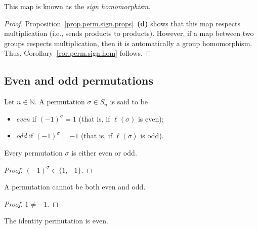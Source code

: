 This map is known as the \emph{sign homomorphism}.

\begin{proof}
Proposition~\ref{prop.perm.sign.props}~\textbf{(d)} shows that this map
respects multiplication (i.e., sends products to products). However, if a
map between two groups respects multiplication, then it is automatically a
group homomorphism. Thus, Corollary~\ref{cor.perm.sign.hom} follows.
\end{proof}

\subsection{Even and odd permutations}

\begin{definition}
\label{def.perm.even-odd}
\leantarget
\leanok
Let $n \in \mathbb{N}$. A permutation $\sigma \in S_n$ is said to be
\begin{itemize}
\item \emph{even} if $(-1)^{\sigma} = 1$ (that is, if $\ell(\sigma)$ is even);
\item \emph{odd} if $(-1)^{\sigma} = -1$ (that is, if $\ell(\sigma)$ is odd).
\end{itemize}
\end{definition}

\begin{lemma}
\label{lem.perm.isEven_or_isOdd}
\leanhelper
\leanok
Every permutation $\sigma$ is either even or odd.
\end{lemma}

\begin{proof}
\leanok
$(-1)^{\sigma} \in \{1, -1\}$.
\end{proof}

\begin{lemma}
\label{lem.perm.not_isEven_and_isOdd}
\leanhelper
\leanok
A permutation cannot be both even and odd.
\end{lemma}

\begin{proof}
\leanok
$1 \neq -1$.
\end{proof}

\begin{lemma}
\label{lem.perm.isEven_one}
\leanhelper
\leanok
The identity permutation is even.
\end{lemma}

